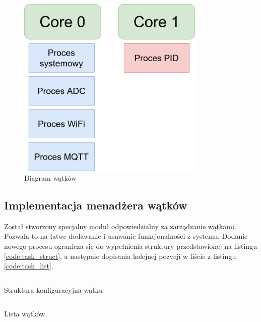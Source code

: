             \begin{figure}[ht]
                \centering
                \includegraphics[width=0.8\textwidth]{img/task_diagram.png}
                \caption{Diagram wątków}
                \label{fig:task_diagram}
            \end{figure}
            
            \subsection{Implementacja menadżera wątków}
            Został stworzony specjalny moduł odpowiedzialny za zarządzanie wątkami. Pozwala to na łatwe dodawanie i usuwanie funkcjonalności z systemu. Dodanie nowego procesu ogranicza się do wypełnienia struktury przedstawionej na listingu \ref{code:task_struct}, a następnie dopisania kolejnej pozycji w liście z listingu \ref{code:task_list}.
            
            \begin{kod}
              \inputminted[firstline=12, lastline=22]{cpp}{esp/listings/task_mngm.hpp}
              \caption{Struktura konfiguracyjna wątku}
              \label{code:task_struct}
              \vspace{2em}
            \end{kod}
            
            \begin{kod}
              \inputminted[firstline=25, lastline=32]{cpp}{esp/listings/task_mngm.hpp}
              \caption{Lista wątków}
              \label{code:task_list}
              \vspace{2em}
            \end{kod}
            
